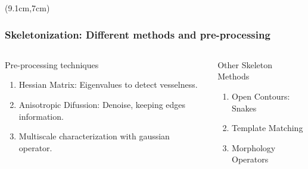 \documentclass[10pt]{beamer}
\begin{document}
\begin{frame}[t]
\begin{textblock*}{1.5cm}
\end{textblock*}
\begin{textblock*}{2cm}(9.1cm,7cm)
\end{textblock*}
\end{frame}
\begin{frame}
  \frametitle{Skeletonization: Different methods and pre-processing}
  \begin{columns}[onlytextwidth]
      \begin{alertblock}{Pre-processing techniques}
          \begin{enumerate}
              \item Hessian Matrix: Eigenvalues to detect vesselness.
              \item Anisotropic Difussion: Denoise, keeping edges information.
              \item Multiscale characterization with gaussian operator.
          \end{enumerate}
      \end{alertblock}
      \begin{alertblock}{Other Skeleton Methods}
          \begin{enumerate}
              \item Open Contours: Snakes
              \item Template Matching
              \item Morphology Operators
          \end{enumerate}
      \end{alertblock}
  \end{columns}
\end{frame}
\end{document}
